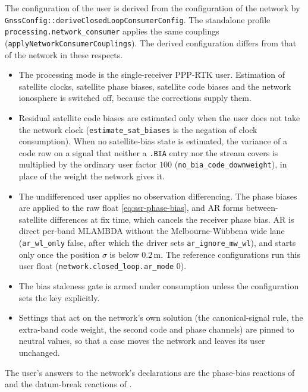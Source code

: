 \documentclass[main.tex]{subfiles}
\begin{document}
The configuration of the user is derived from the configuration of the network
by \texttt{GnssConfig::\allowbreak deriveClosedLoopConsumerConfig}. The
standalone profile \texttt{processing.\allowbreak network\_consumer} applies
the same couplings (\texttt{applyNetwork\allowbreak ConsumerCouplings}). The
derived configuration differs from that of the network in these respects.
\begin{itemize}[leftmargin=*, itemsep=0pt]
\item The processing mode is the single-receiver PPP-RTK user. Estimation of
      satellite clocks, satellite phase biases, satellite code biases and the
      network ionosphere is switched off, because the corrections supply them.
\item Residual satellite code biases are estimated only when the user does not
      take the network clock (\texttt{estimate\_sat\_biases} is the negation of
      clock consumption). When no satellite-bias state is estimated, the variance
      of a code row on a signal that neither a \texttt{.BIA} entry nor the
      stream covers is multiplied by the ordinary user factor $100$
      (\texttt{no\_bia\_code\_downweight}), in place of the weight the network
      gives it.
\item The undifferenced user applies no observation differencing. The phase
      biases are applied to the raw float \eqref{eq:ssr-phase-bias}, and AR
      forms between-satellite differences at fix time, which cancels the
      receiver phase bias. AR is direct per-band MLAMBDA without the
      Melbourne-W\"ubbena wide lane (\texttt{ar\_wl\_only} false, after which
      the driver sets \texttt{ar\_ignore\_mw\_wl}), and starts only once the
      position $\sigma$ is below $0.2$\,m. The reference configurations run
      this user float (\texttt{network.closed\_loop.ar\_mode} 0).
\item The bias staleness gate is armed under consumption unless the
      configuration sets the key explicitly.
\item Settings that act on the network's own solution (the canonical-signal
      rule, the extra-band code weight, the second code and phase channels) are
      pinned to neutral values, so that a case moves the network and leaves its
      user unchanged.
\end{itemize}
The user's answers to the network's declarations are the phase-bias reactions
of  and the datum-break reactions of
.
\end{document}
